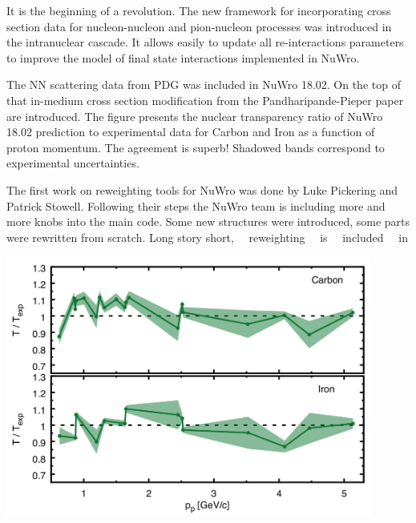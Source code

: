 \documentclass{article}
\begin{document}
\begin{minipage}{0.29\textwidth}

\vspace{10pt}


It is the beginning of a revolution. The new framework for incorporating cross section data for nucleon-nucleon and pion-nucleon processes was introduced in the intranuclear cascade. It allows easily to update all re-interactions parameters to improve the model of final state interactions implemented in NuWro.

The NN scattering data from PDG was included in NuWro 18.02. On the top of that in-medium cross section modification from the Pandharipande-Pieper paper are introduced. The figure presents the nuclear transparency ratio of NuWro 18.02 prediction to experimental data for Carbon and Iron as a function of proton momentum. The agreement is superb! Shadowed bands correspond to experimental uncertainties.


The first work on reweighting tools for NuWro was done by Luke Pickering and Patrick Stowell. Following their steps the NuWro team is including more and more knobs into the main code. Some new structures were introduced, some parts were rewritten from scratch. Long story short,~~ reweighting~~ is~~ included~~ in

\end{minipage}\hspace{0.5cm}\begin{minipage}{0.71\textwidth}

\includegraphics[width=0.9\textwidth]{img/1802_transparency.png}


\end{minipage}
\end{document}

